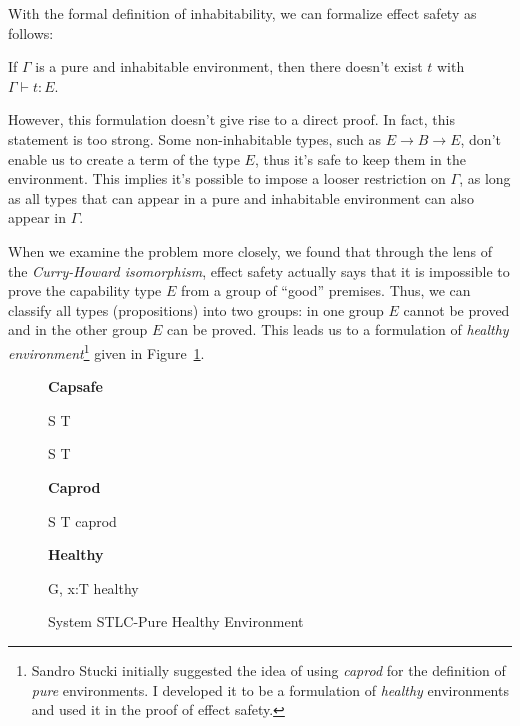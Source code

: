 With the formal definition of inhabitability, we can formalize effect
safety as follows:

\begin{definition}
  If $\Gamma$ is a pure and inhabitable environment, then there
  doesn't exist $t$ with $\Gamma \vdash t : E$.
\end{definition}

However, this formulation doesn't give rise to a direct proof. In
fact, this statement is too strong. Some non-inhabitable types, such
as $E \to B \to E$, don't enable us to create a term of the type $E$,
thus it's safe to keep them in the environment. This implies it's
possible to impose a looser restriction on $\Gamma$, as long as all
types that can appear in a pure and inhabitable environment can also
appear in $\Gamma$.

When we examine the problem more closely, we found that through the
lens of the \emph{Curry-Howard isomorphism}, effect safety actually
says that it is impossible to prove the capability type $E$ from a
group of ``good'' premises. Thus, we can classify all types
(propositions) into two groups: in one group $E$ cannot be proved and
in the other group $E$ can be proved. This leads us to a formulation
of \emph{healthy environment}\footnote{Sandro Stucki initially
  suggested the idea of using \emph{caprod} for the definition of
  \emph{pure} environments. I developed it to be a formulation of
  \emph{healthy} environments and used it in the proof of effect
  safety.} given in Figure~\ref{fig:stlc-pure-healthy-definition}.

\begin{figure}[h]
\begin{framed}

\setlength{\columnseprule}{0.4pt}
\begin{multicols}{2}

\textbf{Capsafe}


{ S \to T \quad {} }

{ S \to T \quad {} }

\columnbreak

\textbf{Caprod}


{ S \to T \quad caprod }

\textbf{Healthy}


{ G, \; x:T \quad healthy }


\end{multicols}
\end{framed}

\caption{System STLC-Pure Healthy Environment}
\label{fig:stlc-pure-healthy-definition}
\end{figure}

